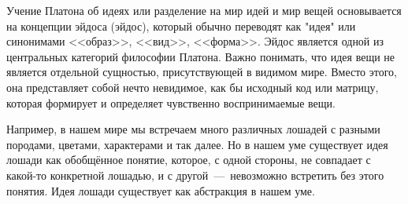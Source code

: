 
Учение Платона об идеях или разделение на мир идей и мир вещей основывается на концепции эйдоса (эйдос), который обычно переводят как "идея" или синонимами <<образ>>, <<вид>>, <<форма>>. Эйдос является одной из центральных категорий философии Платона. Важно понимать, что идея вещи не является отдельной сущностью, присутствующей в видимом мире. Вместо этого, она представляет собой нечто невидимое, как бы исходный код или матрицу, которая формирует и определяет чувственно воспринимаемые вещи.

Например, в нашем мире мы встречаем много различных лошадей с разными породами, цветами, характерами и так далее. Но в нашем уме существует идея лошади как обобщённое понятие, которое, с одной стороны, не совпадает с какой-то конкретной лошадью, и с другой~---~невозможно встретить без этого понятия. Идея лошади существует как абстракция в нашем уме.



